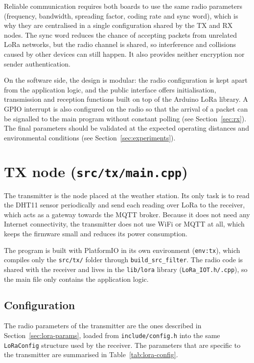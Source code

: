 \documentclass[informe,english]{plantilla}
\begin{document}
Reliable communication requires both boards to use the same radio parameters (frequency, bandwidth, spreading factor, coding rate and sync word), which is why they are centralised in a single configuration shared by the TX and RX nodes. The sync word reduces the chance of accepting packets from unrelated LoRa networks, but the radio channel is shared, so interference and collisions caused by other devices can still happen. It also provides neither encryption nor sender authentication.

On the software side, the design is modular: the radio configuration is kept apart from the application logic, and the public interface offers initialisation, transmission and reception functions built on top of the Arduino LoRa library. A GPIO interrupt is also configured on the radio so that the arrival of a packet can be signalled to the main program without constant polling (see Section~\ref{sec:rx}). The final parameters should be validated at the expected operating distances and environmental conditions (see Section~\ref{sec:experiments}).

\section{TX node (\texttt{src/tx/main.cpp})}
\label{sec:tx}

The transmitter is the node placed at the weather station. Its only task is to read the DHT11 sensor periodically and send each reading over LoRa to the receiver, which acts as a gateway towards the MQTT broker. Because it does not need any Internet connectivity, the transmitter does not use WiFi or MQTT at all, which keeps the firmware small and reduces its power consumption.

The program is built with PlatformIO in its own environment (\texttt{env:tx}), which compiles only the \texttt{src/tx/} folder through
\texttt{build\_src\_filter}. The radio code is shared with the receiver and lives in the \texttt{lib/lora} library (\texttt{LoRa\_IOT.h/.cpp}), so the main file only contains the application logic.

\subsection{Configuration}

The radio parameters of the transmitter are the ones described in Section~\ref{sec:lora-params}, loaded from \texttt{include/config.h} into the same \texttt{LoRaConfig} structure used by the receiver. The parameters that are specific to the transmitter are summarised in Table~\ref{tab:lora-config}.
\end{document}

